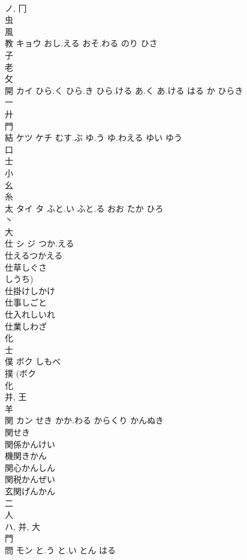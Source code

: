 \documentclass[8pt]{extreport}
\begin{document}
\begin{CJK}{UTF8}{min}
\\	ノ, 冂 
\\	虫 
\\	風 
\\	教	キョウ	おし.える おそ.わる のり ひさ	
\\	子 
\\	老 
\\	攵 
\\	開	カイ	ひら.く ひら.き ひら.ける あ.く あ.ける はる か ひらき	
\\	一 
\\	廾 
\\	門 
\\	結	ケツ ケチ	むす.ぶ ゆ.う ゆ.わえる ゆい ゆう	
\\	口 
\\	士 
\\	小 
\\	幺 
\\	糸 
\\	太	タイ タ	ふと.い ふと.る おお たか ひろ	
\\	丶 
\\	大 
\\	仕	シ ジ	つか.える	
\\	仕えるつかえる 
\\	仕草しぐさ 
\\	しうち)
\\	仕掛けしかけ 
\\	仕事しごと 
\\	仕入れしいれ 
\\	仕業しわざ 
\\	化 
\\	士 
\\	僕	ボク	しもべ	
\\	撲 (ボク 
\\	化 
\\	并, 王 
\\	羊 
\\	関	カン	せき かか.わる からくり かんぬき	
\\	関せき 
\\	関係かんけい 
\\	機関きかん 
\\	関心かんしん 
\\	関税かんぜい 
\\	玄関げんかん 
\\	二 
\\	人 
\\	ハ, 并, 大 
\\	門 
\\	問	モン	と.う と.い とん はる	

\end{CJK}
\end{document}
